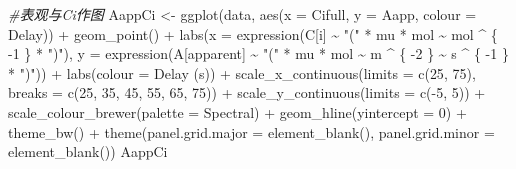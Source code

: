 \documentclass[
]{krantz}
\makeatletter
\newenvironment{Shaded}{\begin{snugshade}}{\end{snugshade}}
\newcommand{\AttributeTok}[1]{\textcolor[rgb]{0.77,0.63,0.00}{#1}}
\newcommand{\CommentTok}[1]{\textcolor[rgb]{0.56,0.35,0.01}{\textit{#1}}}
\newcommand{\DecValTok}[1]{\textcolor[rgb]{0.00,0.00,0.81}{#1}}
\newcommand{\FunctionTok}[1]{\textcolor[rgb]{0.00,0.00,0.00}{#1}}
\newcommand{\NormalTok}[1]{#1}
\newcommand{\OtherTok}[1]{\textcolor[rgb]{0.56,0.35,0.01}{#1}}
\newcommand{\SpecialCharTok}[1]{\textcolor[rgb]{0.00,0.00,0.00}{#1}}
\newcommand{\StringTok}[1]{\textcolor[rgb]{0.31,0.60,0.02}{#1}}
\newenvironment{kframe}{%
\medskip{}
\setlength{\fboxsep}{.8em}
 \def\at@end@of@kframe{}%
 \ifinner\ifhmode%
  \def\at@end@of@kframe{\end{minipage}}%
  \begin{minipage}{\columnwidth}%
 \fi\fi%
 \def\FrameCommand##1{\hskip\@totalleftmargin \hskip-\fboxsep
 \colorbox{shadecolor}{##1}\hskip-\fboxsep
     \hskip-\linewidth \hskip-\@totalleftmargin \hskip\columnwidth}%
 \MakeFramed {\advance\hsize-\width
   \@totalleftmargin\z@ \linewidth\hsize
   \@setminipage}}%
 {\par\unskip\endMakeFramed%
 \at@end@of@kframe}
\renewenvironment{Shaded}{\begin{kframe}}{\end{kframe}}
\makeatother
\begin{document}
\begin{Shaded}
\begin{Highlighting}[]
\CommentTok{\#表观与Ci作图}
\NormalTok{AappCi }\OtherTok{\textless{}{-}} \FunctionTok{ggplot}\NormalTok{(data, }\FunctionTok{aes}\NormalTok{(}\AttributeTok{x =}\NormalTok{ Cifull, }\AttributeTok{y =}\NormalTok{ Aapp, }\AttributeTok{colour =}\NormalTok{ Delay)) }\SpecialCharTok{+}
  \FunctionTok{geom\_point}\NormalTok{() }\SpecialCharTok{+}
  \FunctionTok{labs}\NormalTok{(}\AttributeTok{x =} \FunctionTok{expression}\NormalTok{(C[i] }\SpecialCharTok{\textasciitilde{}} \StringTok{"("} \SpecialCharTok{*}\NormalTok{ mu }\SpecialCharTok{*}\NormalTok{ mol }\SpecialCharTok{\textasciitilde{}}\NormalTok{ mol }\SpecialCharTok{\^{}}\NormalTok{ \{}
    \SpecialCharTok{{-}}\DecValTok{1}
\NormalTok{  \} }\SpecialCharTok{*} \StringTok{")"}\NormalTok{),}
  \AttributeTok{y =} \FunctionTok{expression}\NormalTok{(A[apparent] }\SpecialCharTok{\textasciitilde{}} \StringTok{"("} \SpecialCharTok{*}\NormalTok{ mu }\SpecialCharTok{*}\NormalTok{ mol }\SpecialCharTok{\textasciitilde{}}\NormalTok{ m }\SpecialCharTok{\^{}}\NormalTok{ \{}
    \SpecialCharTok{{-}}\DecValTok{2}
\NormalTok{  \} }\SpecialCharTok{\textasciitilde{}}\NormalTok{ s }\SpecialCharTok{\^{}}\NormalTok{ \{}
    \SpecialCharTok{{-}}\DecValTok{1}
\NormalTok{  \} }\SpecialCharTok{*} \StringTok{")"}\NormalTok{)) }\SpecialCharTok{+}
  \FunctionTok{labs}\NormalTok{(}\AttributeTok{colour =} \StringTok{\textquotesingle{}Delay (s)\textquotesingle{}}\NormalTok{) }\SpecialCharTok{+}
  \FunctionTok{scale\_x\_continuous}\NormalTok{(}\AttributeTok{limits =} \FunctionTok{c}\NormalTok{(}\DecValTok{25}\NormalTok{, }\DecValTok{75}\NormalTok{),}
                     \AttributeTok{breaks =} \FunctionTok{c}\NormalTok{(}\DecValTok{25}\NormalTok{, }\DecValTok{35}\NormalTok{, }\DecValTok{45}\NormalTok{, }\DecValTok{55}\NormalTok{, }\DecValTok{65}\NormalTok{, }\DecValTok{75}\NormalTok{)) }\SpecialCharTok{+}
  \FunctionTok{scale\_y\_continuous}\NormalTok{(}\AttributeTok{limits =} \FunctionTok{c}\NormalTok{(}\SpecialCharTok{{-}}\DecValTok{5}\NormalTok{, }\DecValTok{5}\NormalTok{)) }\SpecialCharTok{+}
  \FunctionTok{scale\_colour\_brewer}\NormalTok{(}\AttributeTok{palette =} \StringTok{\textquotesingle{}Spectral\textquotesingle{}}\NormalTok{) }\SpecialCharTok{+}
  \FunctionTok{geom\_hline}\NormalTok{(}\AttributeTok{yintercept =} \DecValTok{0}\NormalTok{) }\SpecialCharTok{+}
  \FunctionTok{theme\_bw}\NormalTok{() }\SpecialCharTok{+}
  \FunctionTok{theme}\NormalTok{(}\AttributeTok{panel.grid.major =} \FunctionTok{element\_blank}\NormalTok{(),}
        \AttributeTok{panel.grid.minor =} \FunctionTok{element\_blank}\NormalTok{())}
\NormalTok{AappCi}
\end{Highlighting}
\end{Shaded}
\end{document}
